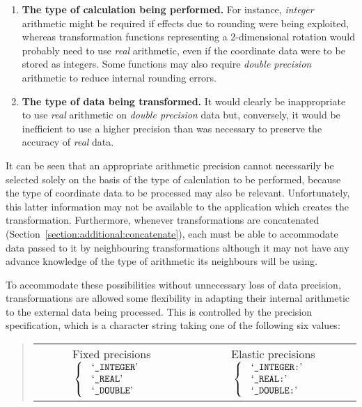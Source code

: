 \begin{enumerate} 

\item {\bf The type of calculation being performed.}
For instance, {\em integer} arithmetic might be required if effects due to
rounding were being exploited, whereas transformation functions representing
a 2-dimensional rotation would probably need to use {\em real} arithmetic,
even if the coordinate data were to be stored as integers. 
Some functions may also require {\em double precision} arithmetic to reduce
internal rounding errors. 

\item {\bf The type of data being transformed.}
It would clearly be inappropriate to use {\em real} arithmetic on {\em
double precision} data but, conversely, it would be inefficient to use a
higher precision than was necessary to preserve the accuracy of {\em real}
data. 

\end{enumerate} 

It can be seen that an appropriate arithmetic precision cannot necessarily
be selected solely on the basis of the type of calculation to be performed,
because the type of coordinate data to be processed may also be relevant.
Unfortunately, this latter information may not be available to the
application which creates the transformation.
Furthermore, whenever transformations are concatenated
(Section~\ref{section:additional:concatenate}), each must be able to
accommodate data passed to it by neighbouring transformations although it
may not have any advance knowledge of the type of arithmetic its neighbours
will be using. 

To accommodate these possibilities without unnecessary loss of data
precision, transformations are allowed some flexibility in adapting their
internal arithmetic to the external data being processed.
This is controlled by the precision specification, which is a character
string taking one of the following six values:

\begin{quote}
\begin{center}
\begin{tabular}{cc} 

Fixed precisions $\left\{ \mbox{
\begin{tabular}{l}
`{\tt \_INTEGER}'\\
`{\tt \_REAL}'\\
`{\tt \_DOUBLE}'
\end{tabular} } \right.$
& Elastic precisions $\left\{ \mbox{
\begin{tabular}{l}
`{\tt \_INTEGER:}'\\
`{\tt \_REAL:}'\\
`{\tt \_DOUBLE:}'
\end{tabular} } \right.$ 

\end{tabular}
\end{center}
\end{quote} 

